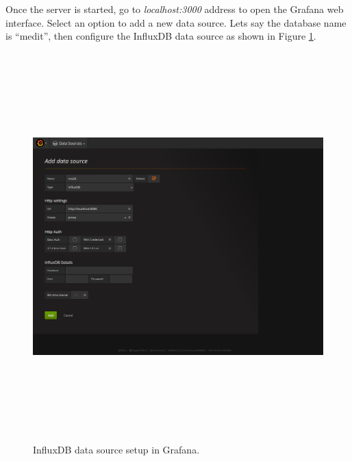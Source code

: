  
 Once the server is started, go to \textit{localhost:3000} address to open the Grafana web interface. Select an option to add a new data source. Lets say the database name is ``medit'', then configure the InfluxDB data source as shown in Figure \ref{fig:gr_db_setup}.
 
 \begin{figure}[htpb]
 	\centering
 	\includegraphics[width=16cm,height=15cm,keepaspectratio=true]{images/gr_db_setup}
 	\caption{
 		InfluxDB data source setup in Grafana.
 	}
 	\label{fig:gr_db_setup}
 \end{figure}



